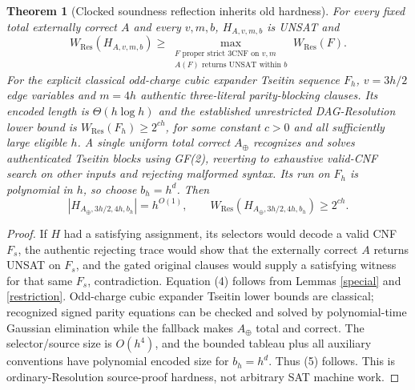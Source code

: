 \documentclass[11pt]{article}
\newtheorem{theorem}{Theorem}
\begin{document}
\begin{theorem}[Clocked soundness reflection inherits old hardness]\label{main}
For every fixed total externally correct \(A\) and every \(v,m,b\), \(H_{A,v,m,b}\) is UNSAT and
\[
\boxed{W_{\mathrm{Res}}(H_{A,v,m,b})\ge
\max_{\substack{F\text{ proper strict 3CNF on }v,m\\
A(F)\text{ returns UNSAT within }b}}
W_{\mathrm{Res}}(F).} \tag{4}
\]
For the explicit classical odd-charge cubic expander Tseitin sequence \(F_h\), \(v=3h/2\) edge variables and \(m=4h\) authentic three-literal parity-blocking clauses. Its encoded length is \(\Theta(h\log h)\) and the established unrestricted DAG-Resolution lower bound is \(W_{\mathrm{Res}}(F_h)\ge 2^{c h}\), for some constant \(c>0\) and all sufficiently large eligible \(h\). A single uniform total correct \(A_\oplus\) recognizes and solves authenticated Tseitin blocks using GF(2), reverting to exhaustive valid-CNF search on other inputs and rejecting malformed syntax. Its run on \(F_h\) is polynomial in \(h\), so choose \(b_h=h^d\). Then
\[
|H_{A_\oplus,3h/2,4h,b_h}|=h^{O(1)},\qquad
W_{\mathrm{Res}}(H_{A_\oplus,3h/2,4h,b_h})\ge2^{c h}. \tag{5}
\]
\end{theorem}
\begin{proof}
If \(H\) had a satisfying assignment, its selectors would decode a valid CNF \(F_s\), the authentic rejecting trace would show that the externally correct \(A\) returns UNSAT on \(F_s\), and the gated original clauses would supply a satisfying witness for that same \(F_s\), contradiction. Equation (4) follows from Lemmas \ref{special} and \ref{restriction}. Odd-charge cubic expander Tseitin lower bounds are classical; recognized signed parity equations can be checked and solved by polynomial-time Gaussian elimination while the fallback makes \(A_\oplus\) total and correct. The selector/source size is \(O(h^4)\), and the bounded tableau plus all auxiliary conventions have polynomial encoded size for \(b_h=h^d\). Thus (5) follows. This is ordinary-Resolution source-proof hardness, not arbitrary SAT machine work.
\end{proof}
\end{document}
